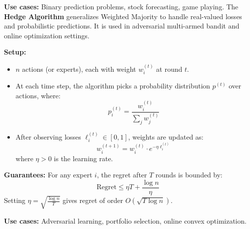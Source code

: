 \documentclass[a4paper,landscape]{article}
\begin{document}
\begin{multicols}{7}
\textbf{Use cases:} Binary prediction problems, stock forecasting, game playing.
\endtcolorbox
\tcolorbox[mybox={Hedge Algorithm}]
The \textbf{Hedge Algorithm} generalizes Weighted Majority to handle real-valued losses and probabilistic predictions. It is used in adversarial multi-armed bandit and online optimization settings.


\textbf{Setup:}
\begin{itemize}[noitemsep, topsep=0pt]
    \item $n$ actions (or experts), each with weight $w_i^{(t)}$ at round $t$.
    \item At each time step, the algorithm picks a probability distribution $p^{(t)}$ over actions, where:
    \[
    p_i^{(t)} = \frac{w_i^{(t)}}{\sum_j w_j^{(t)}}
    \]
    \item After observing losses $\ell_i^{(t)} \in [0,1]$, weights are updated as:
    \[
    w_i^{(t+1)} = w_i^{(t)} \cdot e^{-\eta \ell_i^{(t)}}
    \]
    where $\eta > 0$ is the learning rate.
\end{itemize}


\textbf{Guarantees:}  
For any expert $i$, the regret after $T$ rounds is bounded by:
\[
\text{Regret} \leq \eta T + \frac{\log n}{\eta}
\]
Setting $\eta = \sqrt{\frac{\log n}{T}}$ gives regret of order $O(\sqrt{T \log n})$.


\textbf{Use cases:} Adversarial learning, portfolio selection, online convex optimization.
\endtcolorbox


\end{multicols}
\end{document}
